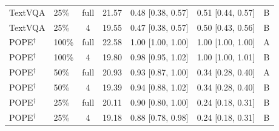 \begin{tabular}{llcccc c}
TextVQA & 25\% & full & 21.57 & 0.48 {\scriptsize[0.38, 0.57]} & 0.51 {\scriptsize[0.44, 0.57]} & B \\
TextVQA & 25\% & 4 & 19.55 & 0.47 {\scriptsize[0.38, 0.57]} & 0.50 {\scriptsize[0.43, 0.56]} & B \\
\midrule
POPE$^\dagger$ & 100\% & full & 22.58 & 1.00 {\scriptsize[1.00, 1.00]} & 1.00 {\scriptsize[1.00, 1.00]} & A \\
POPE$^\dagger$ & 100\% & 4 & 19.80 & 0.98 {\scriptsize[0.95, 1.02]} & 1.00 {\scriptsize[1.00, 1.01]} & B \\
POPE$^\dagger$ & 50\% & full & 20.93 & 0.93 {\scriptsize[0.87, 1.00]} & 0.34 {\scriptsize[0.28, 0.40]} & A \\
POPE$^\dagger$ & 50\% & 4 & 19.39 & 0.94 {\scriptsize[0.88, 1.02]} & 0.34 {\scriptsize[0.28, 0.40]} & B \\
POPE$^\dagger$ & 25\% & full & 20.11 & 0.90 {\scriptsize[0.80, 1.00]} & 0.24 {\scriptsize[0.18, 0.31]} & B \\
POPE$^\dagger$ & 25\% & 4 & 19.18 & 0.88 {\scriptsize[0.78, 0.98]} & 0.24 {\scriptsize[0.18, 0.31]} & B \\
\bottomrule
\end{tabular}
